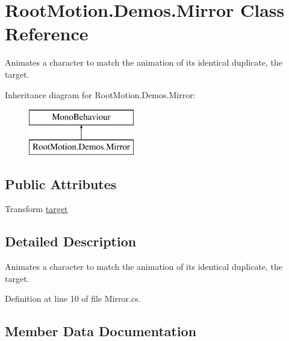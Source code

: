 \hypertarget{class_root_motion_1_1_demos_1_1_mirror}{}\section{Root\+Motion.\+Demos.\+Mirror Class Reference}
\label{class_root_motion_1_1_demos_1_1_mirror}


Animates a character to match the animation of it\textquotesingle{}s identical duplicate, the target.  


Inheritance diagram for Root\+Motion.\+Demos.\+Mirror\+:\begin{figure}[H]
\begin{center}
\leavevmode
\includegraphics[height=2.000000cm]{class_root_motion_1_1_demos_1_1_mirror}
\end{center}
\end{figure}
\subsection*{Public Attributes}
\begin{DoxyCompactItemize}
\item 
Transform \mbox{\hyperlink{class_root_motion_1_1_demos_1_1_mirror_a82e7f2662913f8b602d2dee75df3563a}{target}}
\end{DoxyCompactItemize}


\subsection{Detailed Description}
Animates a character to match the animation of it\textquotesingle{}s identical duplicate, the target. 



Definition at line 10 of file Mirror.\+cs.



\subsection{Member Data Documentation}
\mbox{\label{class_root_motion_1_1_demos_1_1_mirror_a82e7f2662913f8b602d2dee75df3563a}} 
